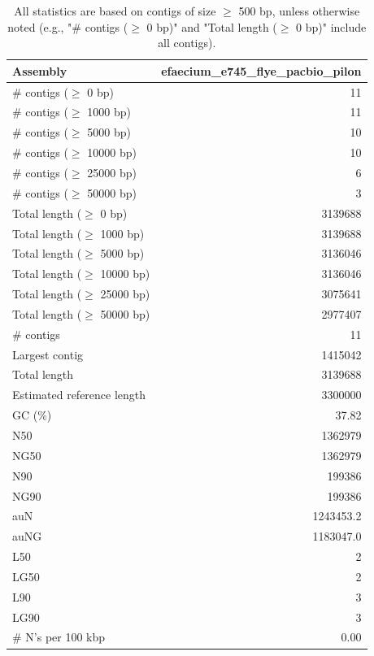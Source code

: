 \documentclass[12pt,a4paper]{article}
\begin{document}
\begin{table}[ht]
\begin{center}
\caption{All statistics are based on contigs of size $\geq$ 500 bp, unless otherwise noted (e.g., "\# contigs ($\geq$ 0 bp)" and "Total length ($\geq$ 0 bp)" include all contigs).}
\begin{tabular}{|l*{1}{|r}|}
\hline
Assembly & efaecium\_e745\_flye\_pacbio\_pilon \\ \hline
\# contigs ($\geq$ 0 bp) & 11 \\ \hline
\# contigs ($\geq$ 1000 bp) & 11 \\ \hline
\# contigs ($\geq$ 5000 bp) & 10 \\ \hline
\# contigs ($\geq$ 10000 bp) & 10 \\ \hline
\# contigs ($\geq$ 25000 bp) & 6 \\ \hline
\# contigs ($\geq$ 50000 bp) & 3 \\ \hline
Total length ($\geq$ 0 bp) & 3139688 \\ \hline
Total length ($\geq$ 1000 bp) & 3139688 \\ \hline
Total length ($\geq$ 5000 bp) & 3136046 \\ \hline
Total length ($\geq$ 10000 bp) & 3136046 \\ \hline
Total length ($\geq$ 25000 bp) & 3075641 \\ \hline
Total length ($\geq$ 50000 bp) & 2977407 \\ \hline
\# contigs & 11 \\ \hline
Largest contig & 1415042 \\ \hline
Total length & 3139688 \\ \hline
Estimated reference length & 3300000 \\ \hline
GC (\%) & 37.82 \\ \hline
N50 & 1362979 \\ \hline
NG50 & 1362979 \\ \hline
N90 & 199386 \\ \hline
NG90 & 199386 \\ \hline
auN & 1243453.2 \\ \hline
auNG & 1183047.0 \\ \hline
L50 & 2 \\ \hline
LG50 & 2 \\ \hline
L90 & 3 \\ \hline
LG90 & 3 \\ \hline
\# N's per 100 kbp & 0.00 \\ \hline
\end{tabular}
\end{center}
\end{table}
\end{document}
